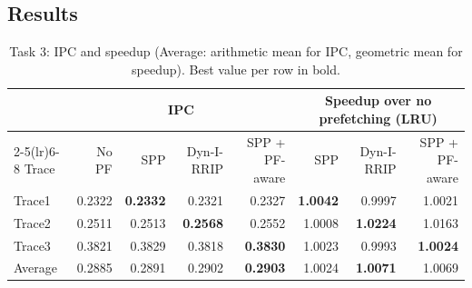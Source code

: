 \documentclass[11pt]{article}
\begin{document}
\subsection{Results}

\begin{table}[H]
\centering
\small
\setlength{\tabcolsep}{4pt}
\begin{tabular}{l rrrr rrr}
\toprule
& \multicolumn{4}{c}{IPC} & \multicolumn{3}{c}{Speedup over no prefetching (LRU)}\\
\cmidrule(lr){2-5}\cmidrule(lr){6-8}
Trace & No PF & SPP & Dyn-I-RRIP & SPP + PF-aware & SPP & Dyn-I-RRIP & SPP + PF-aware\\
\midrule
Trace1 & 0.2322 & \textbf{0.2332} & 0.2321 & 0.2327 & \textbf{1.0042} & 0.9997 & 1.0021\\
Trace2 & 0.2511 & 0.2513 & \textbf{0.2568} & 0.2552 & 1.0008 & \textbf{1.0224} & 1.0163\\
Trace3 & 0.3821 & 0.3829 & 0.3818 & \textbf{0.3830} & 1.0023 & 0.9993 & \textbf{1.0024}\\
\midrule
Average & 0.2885 & 0.2891 & 0.2902 & \textbf{0.2903} & 1.0024 & \textbf{1.0071} & 1.0069\\
\bottomrule
\end{tabular}
\caption{Task 3: IPC and speedup (Average: arithmetic mean for IPC, geometric
mean for speedup). Best value per row in bold.}
\label{tab:t3-ipc}
\end{table}
\end{document}
